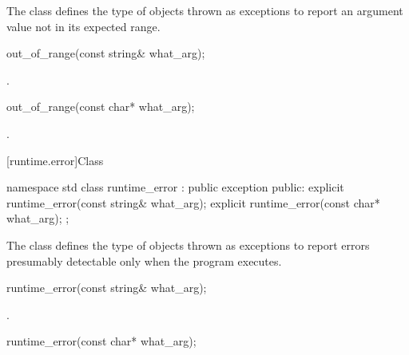 \pnum
The class
defines the type of objects thrown as exceptions to report an
argument value not in its expected range.

%
\begin{itemdecl}
out_of_range(const string& what_arg);
\end{itemdecl}

\begin{itemdescr}
\pnum
{}

\pnum
\ensures
{}.
\end{itemdescr}

%
\begin{itemdecl}
out_of_range(const char* what_arg);
\end{itemdecl}

\begin{itemdescr}
\pnum
{}

\pnum
\ensures
{}.
\end{itemdescr}

[runtime.error]{Class }

%
\begin{codeblock}
namespace std {
  class runtime_error : public exception {
  public:
    explicit runtime_error(const string& what_arg);
    explicit runtime_error(const char* what_arg);
  };
}
\end{codeblock}

\pnum
The class
defines the type of objects thrown as exceptions to report errors presumably detectable only
when the program executes.

%
\begin{itemdecl}
runtime_error(const string& what_arg);
\end{itemdecl}

\begin{itemdescr}
\pnum
{}

\pnum
\ensures
{}.
\end{itemdescr}

%
\begin{itemdecl}
runtime_error(const char* what_arg);
\end{itemdecl}

